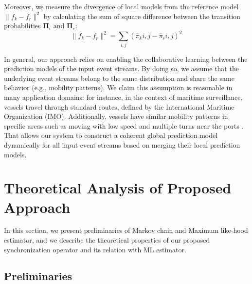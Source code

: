 \par Moreover, we measure the divergence of local models from the reference model  $\|f_k - f_r\|^2$ by calculating the sum of square difference between the transition probabilities  $\boldsymbol{\Pi}_i$ and  $\boldsymbol{\Pi}_r$:
\begin{equation*}
\label{eq:dis_pi_varinace}
\|f_k - f_r\|^2=\sum_{i,j} (\hat{\pi}_k{i,j} -\hat{\pi}_r{i,j})^2
\end{equation*}
\par In general, our approach relies on enabling the collaborative learning between the prediction models of  the input event streams. By doing so, we assume that the underlying event streams belong to the same  distribution and share the same behavior (e.g., mobility patterns). We claim this assumption is reasonable in many application domains: for instance, in the context of maritime surveillance, vessels travel through standard routes, defined by the International Maritime Organization (IMO). Additionally, vessels have similar mobility patterns in specific areas such as moving with low speed and multiple turns near the ports \cite{pallotta2013vessel,liu2014knowledge}. That allows our system to construct a coherent global prediction model dynamically for all input event streams based on merging their local prediction models.


\section{Theoretical Analysis of Proposed Approach}
 
 In this section, we present preliminaries of Markov chain and Maximum like-hood estimator, and we describe the theoretical properties of our proposed synchronization operator and its relation with ML estimator. 
 
 
 \subsection*{Preliminaries}
 
